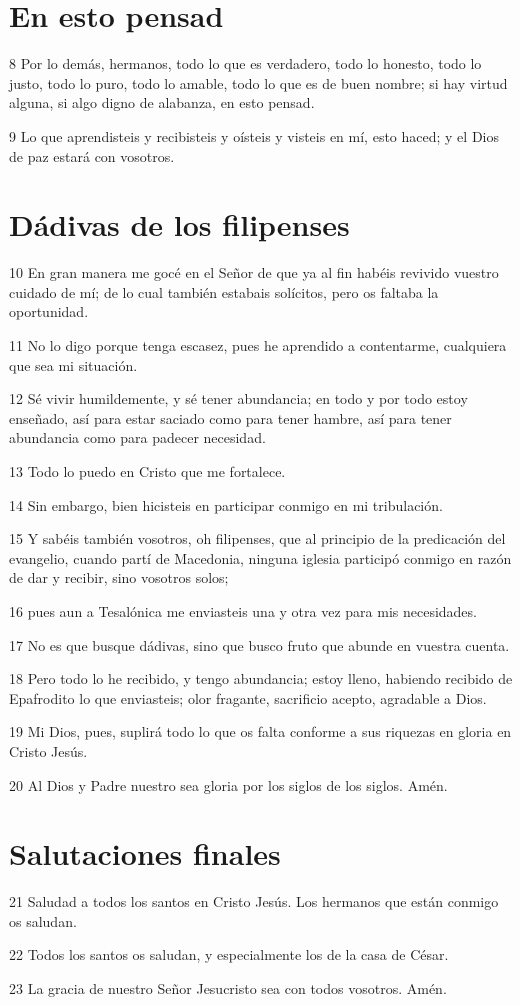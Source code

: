 \section*{En esto pensad}

\par 8 Por lo demás, hermanos, todo lo que es verdadero, todo lo honesto, todo lo justo, todo lo puro, todo lo amable, todo lo que es de buen nombre; si hay virtud alguna, si algo digno de alabanza, en esto pensad.
\par 9 Lo que aprendisteis y recibisteis y oísteis y visteis en mí, esto haced; y el Dios de paz estará con vosotros.

\section*{Dádivas de los filipenses}

\par 10 En gran manera me gocé en el Señor de que ya al fin habéis revivido vuestro cuidado de mí; de lo cual también estabais solícitos, pero os faltaba la oportunidad.
\par 11 No lo digo porque tenga escasez, pues he aprendido a contentarme, cualquiera que sea mi situación.
\par 12 Sé vivir humildemente, y sé tener abundancia; en todo y por todo estoy enseñado, así para estar saciado como para tener hambre, así para tener abundancia como para padecer necesidad.
\par 13 Todo lo puedo en Cristo que me fortalece.
\par 14 Sin embargo, bien hicisteis en participar conmigo en mi tribulación.
\par 15 Y sabéis también vosotros, oh filipenses, que al principio de la predicación del evangelio, cuando partí de Macedonia, ninguna iglesia participó conmigo en razón de dar y recibir, sino vosotros solos;
\par 16 pues aun a Tesalónica me enviasteis una y otra vez para mis necesidades.
\par 17 No es que busque dádivas, sino que busco fruto que abunde en vuestra cuenta.
\par 18 Pero todo lo he recibido, y tengo abundancia; estoy lleno, habiendo recibido de Epafrodito lo que enviasteis; olor fragante, sacrificio acepto, agradable a Dios.
\par 19 Mi Dios, pues, suplirá todo lo que os falta conforme a sus riquezas en gloria en Cristo Jesús.
\par 20 Al Dios y Padre nuestro sea gloria por los siglos de los siglos. Amén.

\section*{Salutaciones finales}

\par 21 Saludad a todos los santos en Cristo Jesús. Los hermanos que están conmigo os saludan.
\par 22 Todos los santos os saludan, y especialmente los de la casa de César.
\par 23 La gracia de nuestro Señor Jesucristo sea con todos vosotros. Amén.

